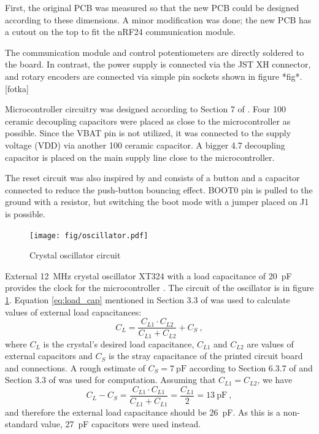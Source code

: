 First, the original PCB was measured so that the new PCB could be designed according to these dimensions. A minor modification was done; the new PCB has a cutout on the top to fit the nRF24 communication module.

The communication module and control potentiometers are directly soldered to the board. In contrast, the power supply is connected via the JST XH connector, and rotary encoders are connected via simple pin sockets shown in figure *fig*. [\todo fotka]

Microcontroller circuitry was designed according to Section 7 of \cite{f3_design_an}. Four \SI{100}{\nF} ceramic decoupling capacitors were placed as close to the microcontroller as possible. Since the VBAT pin is not utilized, it was connected to the supply voltage (VDD) via another \SI{100}{\nF} ceramic capacitor. A bigger \SI{4.7}{\uF} decoupling capacitor is placed on the main supply line close to the microcontroller.

The reset circuit was also inspired by \cite{f3_design_an} and consists of a button and a capacitor connected to reduce the push-button bouncing effect. BOOT0 pin is pulled to the ground with a resistor, but switching the boot mode with a jumper placed on J1 is possible.

\begin{figure}[t]
\centering
\texttt{[image: fig/oscillator.pdf]}
\caption{Crystal oscillator circuit}
\label{fig:osc}
\end{figure}

External \SI{12}{\MHz} crystal oscillator XT324 with a load capacitance of \SI{20}{\pF} provides the clock for the microcontroller \cite{xt324_datasheet}. The circuit of the oscillator is in figure \ref{fig:osc}. Equation \ref{eq:load_cap} mentioned in Section 3.3 of \cite{osc_design_an} was used to calculate values of external load capacitances:
\begin{equation}
C_L = \frac{C_{L1} \cdot C_{L2}}{C_{L1} + C_{L2}} + C_S\ ,
\label{eq:load_cap}
\end{equation}
where $C_L$ is the crystal's desired load capacitance, $C_{L1}$ and $C_{L2}$ are values of external capacitors and $C_S$ is the stray capacitance of the printed circuit board and connections. A rough estimate of $C_S = \SI{7}{\pF}$ according to Section 6.3.7 of \cite{f303_datasheet} and Section 3.3 of \cite{osc_design_an} was used for computation. Assuming that $C_{L1} = C_{L2}$, we have
\begin{equation}
C_L - C_S = \frac{C_{L1} \cdot C_{L1}}{C_{L1} + C_{L1}} = \frac{C_{L1}}{2} = \SI{13}{\pF}\ ,
\end{equation}
and therefore the external load capacitance should be \SI{26}{\pF}. As this is a non-standard value, \SI{27}{\pF} capacitors were used instead.

